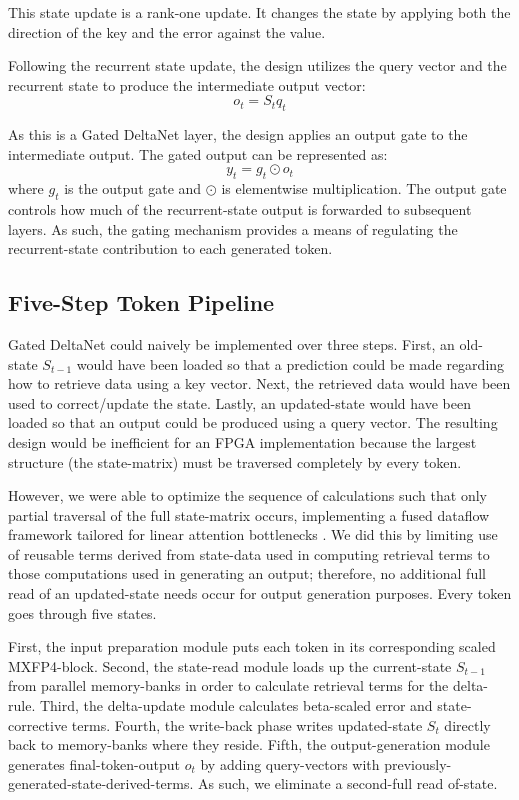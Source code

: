 ﻿\documentclass[conference]{IEEEtran}
\begin{document}
This state update is a rank-one update. It changes the state by applying both the direction of the key and the error against the value.

Following the recurrent state update, the design utilizes the query vector and the recurrent state to produce the intermediate output vector:
\begin{equation}
o_t = S_t q_t
\end{equation}

As this is a Gated DeltaNet layer, the design applies an output gate to the intermediate output. The gated output can be represented as:
\begin{equation}
y_t = g_t \odot o_t
\end{equation}
where $g_t$ is the output gate and $\odot$ is elementwise multiplication. The output gate controls how much of the recurrent-state output is forwarded to subsequent layers. As such, the gating mechanism provides a means of regulating the recurrent-state contribution to each generated token.

\subsection{Five-Step Token Pipeline}
Gated DeltaNet could naively be implemented over three steps. First, an old-state $S_{t-1}$ would have been loaded so that a prediction could be made regarding how to retrieve data using a key vector. Next, the retrieved data would have been used to correct/update the state. Lastly, an updated-state would have been loaded so that an output could be produced using a query vector. The resulting design would be inefficient for an FPGA implementation because the largest structure (the state-matrix) must be traversed completely by every token.

However, we were able to optimize the sequence of calculations such that only partial traversal of the full state-matrix occurs, implementing a fused dataflow framework tailored for linear attention bottlenecks \cite{b10}. We did this by limiting use of reusable terms derived from state-data used in computing retrieval terms to those computations used in generating an output; therefore, no additional full read of an updated-state needs occur for output generation purposes. Every token goes through five states.

First, the input preparation module puts each token in its corresponding scaled MXFP4-block. Second, the state-read module loads up the current-state $S_{t-1}$ from parallel memory-banks in order to calculate retrieval terms for the delta-rule. Third, the delta-update module calculates beta-scaled error and state-corrective terms. Fourth, the write-back phase writes updated-state $S_t$ directly back to memory-banks where they reside. Fifth, the output-generation module generates final-token-output $o_t$ by adding query-vectors with previously-generated-state-derived-terms. As such, we eliminate a second-full read of-state.
\end{document}
